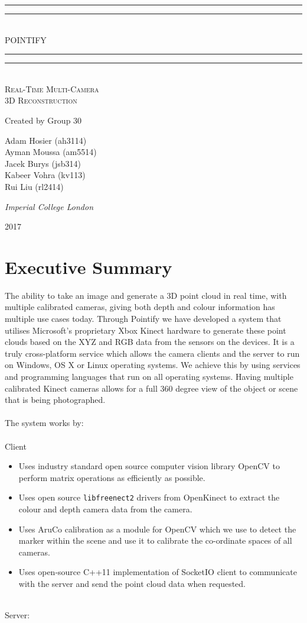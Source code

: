 \documentclass{article}
\newcommand*{\titleGP}{\begingroup %
\centering %
\vspace*{\baselineskip} %

\rule{\textwidth}{1.6pt}\vspace*{-\baselineskip}\vspace*{2pt} %
\rule{\textwidth}{0.4pt}\\[\baselineskip] %

{\LARGE POINTIFY}\\[0.2\baselineskip] %

\rule{\textwidth}{0.4pt}\vspace*{-\baselineskip}\vspace{3.2pt} %
\rule{\textwidth}{1.6pt}\\[\baselineskip] %

\scshape %
Real-Time Multi-Camera \\
3D Reconstruction \par

\vspace*{2\baselineskip}

Created by Group 30\\[\baselineskip]
{\Large Adam Hosier (ah3114)\\ Ayman Moussa (am5514) \\Jacek Burys (jsb314) \\Kabeer Vohra (kv113) \\ Rui Liu (rl2414) \\  \par} %

\vspace*{1\baselineskip}
{\itshape Imperial College London\par} %

\vfill 

{\scshape 2017} \\[0.3\baselineskip] %

\endgroup}
\begin{document}
 

\titleGP
\thispagestyle{empty}

\newpage
\setcounter{page}{1}
\tableofcontents

\newpage
\section{Executive Summary}

The ability to take an image and generate a 3D point cloud in real time, with multiple calibrated cameras, giving both depth and colour information has multiple use cases today. Through Pointify we have developed a system that utilises Microsoft's proprietary Xbox Kinect hardware to generate these point clouds based on the XYZ and RGB data from the sensors on the devices. It is a truly cross-platform service which allows the camera clients and the server to run on Windows, OS X or Linux operating systems. We achieve this by using services and programming languages that run on all operating systems. Having multiple calibrated Kinect cameras allows for a full 360 degree view of the object or scene that is being photographed.
\\\\
The system works by:
\\\\
Client
\begin{itemize}
\item Uses industry standard open source computer vision library OpenCV to perform matrix operations as efficiently as possible.
\item Uses open source \texttt{libfreenect2} drivers from OpenKinect to extract the colour and depth camera data from the camera.
\item Uses AruCo calibration as a module for OpenCV which we use to detect the marker within the scene and use it to calibrate the co-ordinate spaces of all cameras.
\item Uses open-source C++11 implementation of SocketIO client to communicate with the server and send the point cloud data when requested.
\end{itemize}
~\\
Server:
\end{document}
